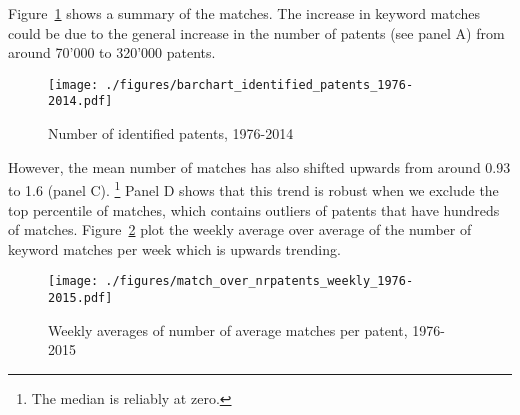 \documentclass[11pt,a4paper]{article}
\begin{document}
Figure~\ref{fig:summary_stats} shows a summary of the matches. The increase in keyword matches could be due to the general increase in the number of patents (see panel A) from around 70'000 to 320'000 patents. 


\begin{figure}[tb]
\caption{Number of identified patents, 1976-2014}
	\texttt{[image: ./figures/barchart\_identified\_patents\_1976-2014.pdf]}
	\label{fig:summary_stats}
\end{figure}





However, the mean number of matches has also shifted upwards from around 0.93 to 1.6 (panel C). \footnote{The median is reliably at zero.} Panel D shows that this trend is robust when we exclude the top percentile of matches, which contains outliers of patents that have hundreds of matches. Figure~\ref{fig:match_per_nrpatents} plot the weekly average over average of the number of keyword matches per week which is upwards trending. 


\begin{figure}[tb]
\caption{Weekly averages of number of average matches per patent, 1976-2015}
	\centering
	\texttt{[image: ./figures/match\_over\_nrpatents\_weekly\_1976-2015.pdf]}
	\label{fig:match_per_nrpatents}
\end{figure}
\end{document}
